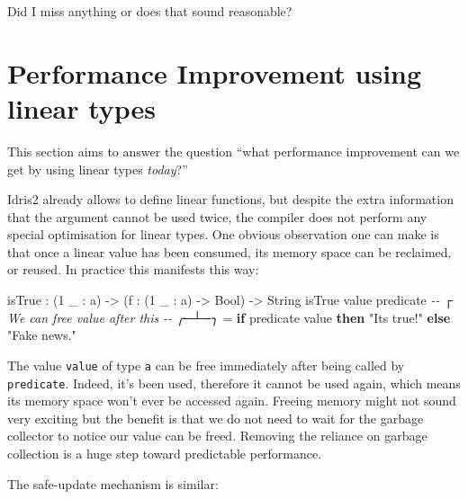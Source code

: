 \documentclass[
]{article}
\newenvironment{Shaded}{}{}
\newcommand{\CommentTok}[1]{\textcolor[rgb]{0.38,0.63,0.69}{\textit{#1}}}
\newcommand{\DataTypeTok}[1]{\textcolor[rgb]{0.56,0.13,0.00}{#1}}
\newcommand{\DecValTok}[1]{\textcolor[rgb]{0.25,0.63,0.44}{#1}}
\newcommand{\KeywordTok}[1]{\textcolor[rgb]{0.00,0.44,0.13}{\textbf{#1}}}
\newcommand{\NormalTok}[1]{#1}
\newcommand{\OperatorTok}[1]{\textcolor[rgb]{0.40,0.40,0.40}{#1}}
\newcommand{\OtherTok}[1]{\textcolor[rgb]{0.00,0.44,0.13}{#1}}
\newcommand{\StringTok}[1]{\textcolor[rgb]{0.25,0.44,0.63}{#1}}
\begin{document}
Did I miss anything or does that sound reasonable?

\hypertarget{performance-improvement-using-linear-types}{%
\section{Performance Improvement using linear
types}\label{performance-improvement-using-linear-types}}

This section aims to answer the question ``what performance improvement
can we get by using linear types \emph{today}?''

Idris2 already allows to define linear functions, but despite the extra
information that the argument cannot be used twice, the compiler does
not perform any special optimisation for linear types. One obvious
observation one can make is that once a linear value has been consumed,
its memory space can be reclaimed, or reused. In practice this manifests
this way:

\begin{Shaded}
\begin{Highlighting}[]
\NormalTok{isTrue }\OperatorTok{:}\NormalTok{ (}\DecValTok{1}\NormalTok{ \_ }\OperatorTok{:}\NormalTok{ a) }\OtherTok{{-}\textgreater{}}\NormalTok{ (f }\OperatorTok{:}\NormalTok{ (}\DecValTok{1}\NormalTok{ \_ }\OperatorTok{:}\NormalTok{ a) }\OtherTok{{-}\textgreater{}} \DataTypeTok{Bool}\NormalTok{) }\OtherTok{{-}\textgreater{}} \DataTypeTok{String}
\NormalTok{isTrue value predicate}
\CommentTok{{-}{-}                 ┌ We can free \textasciigrave{}value\textasciigrave{} after this}
\CommentTok{{-}{-}               ╭─┴─╮}
  \OtherTok{=} \KeywordTok{if}\NormalTok{ predicate value }\KeywordTok{then} \StringTok{"It\textquotesingle{}s true!"}
                       \KeywordTok{else} \StringTok{"Fake news."}
\end{Highlighting}
\end{Shaded}

The value \texttt{value} of type \texttt{a} can be free immediately
after being called by \texttt{predicate}. Indeed, it's been used,
therefore it cannot be used again, which means its memory space won't
ever be accessed again. Freeing memory might not sound very exciting but
the benefit is that we do not need to wait for the garbage collector to
notice our value can be freed. Removing the reliance on garbage
collection is a huge step toward predictable performance.

The safe-update mechanism is similar:
\end{document}
